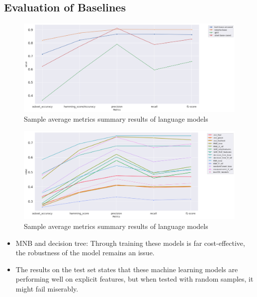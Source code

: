 \subsection{Evaluation of Baselines}
\begin{figure}[h!]
    \centering
    \includegraphics[width=1\textwidth]{thesis/figures/summary.png}
    \caption{Sample average metrics summary results of language models }
    \label{fig:model_wise_group_LM}
\end{figure}
\begin{figure}[h!]
    \centering
    \includegraphics[width=1\textwidth]{thesis/figures/Baslines.png}
    \caption{Sample average metrics summary results of language models }
    \label{fig:model_wise_group_LM}
\end{figure}
\begin{itemize}
    \item MNB and decision tree: Through training these models is far cost-effective, the robustness of the model remains an issue. 
    \item The results on the test set states that these machine learning models are performing well on explicit features, but when tested with random samples, it might fail miserably. 
\end{itemize}



